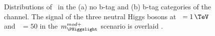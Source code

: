 \begin{figure}[h!]
\begin{center}
\end{center}
\caption[Distributions of \mTtot~in the no b-tag and b-tag categories of 
the \emu channel.]{Distributions of \mTtot~in the (a) no b-tag and (b) b-tag categories 
of the \emu channel. The signal of the three neutral Higgs bosons at \mA~$=1\,\TeV$ 
and \tanb~$=50$ in the $m_{\PHiggslight}^{mod+}$ scenario is overlaid \cite{CMS-PAS-HIG-16-037}.}%
\label{fig:mssm_results_mttot_em}
\end{figure}

